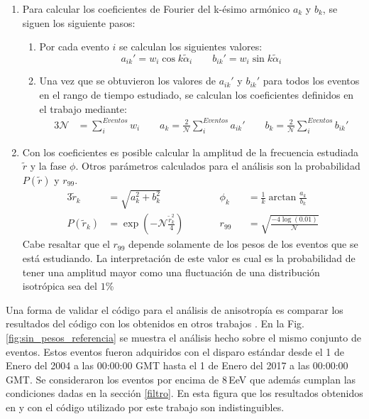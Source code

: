 \begin{enumerate}
        \item Para calcular los coeficientes de Fourier del k-ésimo armónico $a_k$ y $b_k$, se siguen los siguiente pasos:
        \begin{enumerate}
          \item Por cada evento  $i$ se calculan los siguientes valores:
          \begin{equation}
             a_{ik}' = {w_i}\cos k\tilde{\alpha}_i \qquad
             b_{ik}' = {w_i}\sin k\tilde{\alpha}_i
         \end{equation}
         \item Una vez que se obtuvieron los valores de $a_{ik}'$ y $b_{ik}'$ para todos los eventos en el rango de tiempo estudiado, se calculan los coeficientes definidos en el trabajo \cite{analisis_fourier} mediante:
         \begin{alignat}{3}
          \mathcal{N} &= \sum^{Eventos}_i w_i \qquad
            a_k = \frac{2}{\mathcal{N}} \sum^{Eventos}_i a_{ik}' \qquad
            b_k = \frac{2}{\mathcal{N}} \sum^{Eventos}_i b_{ik}'  
         \end{alignat}
        \end{enumerate}
        \item Con los coeficientes es posible calcular la amplitud de la frecuencia estudiada $\tilde{r}$ y la fase $\phi$. Otros parámetros calculados para el análisis son la probabilidad $P(\tilde{r})$  y $r_{99}$. 
        \begin{alignat}{3}
            \tilde{r}_k &= \sqrt{a_k^2 +b_k^2}                       \qquad &&   \phi_k&&= \frac{1}{k}\arctan\frac{a_k}{b_k}\\
          P(\tilde{r}_k)&= \exp(-\mathcal{N}\frac{\tilde{r}_k^2}{4})\qquad &&   r_{99}&&= \sqrt{\frac{-4\log(0.01)}{\mathcal{N}}}
        \end{alignat}
        Cabe resaltar que el $r_{99}$ depende solamente de los pesos de los eventos que se está estudiando. La interpretación  de este valor es cual es la probabilidad de tener una amplitud mayor como una fluctuación de una distribución isotrópica sea del $1$\%
      \end{enumerate}

    Una forma de validar el código para el análisis de anisotropía es comparar los resultados del código con los obtenidos en otros trabajos \cite{taborda}. En la Fig.\ref{fig:sin_pesos_referencia} se muestra el análisis hecho sobre el mismo conjunto de eventos. Estos eventos fueron adquiridos con el disparo estándar desde el 1 de Enero del 2004 a las 00:00:00 GMT  hasta el 1 de Enero del 2017 a las 00:00:00 GMT. Se consideraron los eventos por encima de $8\,$EeV que además cumplan las condiciones dadas en la sección \ref{filtro}.  En esta figura que los resultados obtenidos en \cite{taborda} y con el código utilizado por este trabajo son indistinguibles. 

